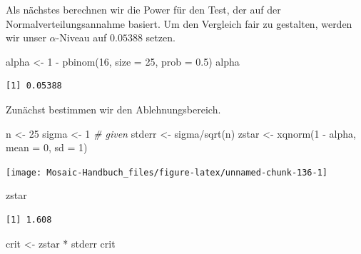 \documentclass[
  ngerman,
]{scrbook}
\newenvironment{Shaded}{\begin{snugshade}}{\end{snugshade}}
\newcommand{\AttributeTok}[1]{\textcolor[rgb]{0.77,0.63,0.00}{#1}}
\newcommand{\CommentTok}[1]{\textcolor[rgb]{0.56,0.35,0.01}{\textit{#1}}}
\newcommand{\DecValTok}[1]{\textcolor[rgb]{0.00,0.00,0.81}{#1}}
\newcommand{\FloatTok}[1]{\textcolor[rgb]{0.00,0.00,0.81}{#1}}
\newcommand{\FunctionTok}[1]{\textcolor[rgb]{0.00,0.00,0.00}{#1}}
\newcommand{\NormalTok}[1]{#1}
\newcommand{\OtherTok}[1]{\textcolor[rgb]{0.56,0.35,0.01}{#1}}
\newcommand{\SpecialCharTok}[1]{\textcolor[rgb]{0.00,0.00,0.00}{#1}}
\begin{document}
Als nächstes berechnen wir die Power für den Test, der auf der Normalverteilungsannahme basiert. Um den Vergleich fair zu gestalten, werden wir unser \(\alpha\)-Niveau auf \(0.05388\) setzen.

\begin{Shaded}
\begin{Highlighting}[]
\NormalTok{alpha }\OtherTok{\textless{}{-}} \DecValTok{1} \SpecialCharTok{{-}} \FunctionTok{pbinom}\NormalTok{(}\DecValTok{16}\NormalTok{, }\AttributeTok{size =} \DecValTok{25}\NormalTok{, }\AttributeTok{prob =} \FloatTok{0.5}\NormalTok{)}
\NormalTok{alpha}
\end{Highlighting}
\end{Shaded}

\begin{verbatim}
[1] 0.05388
\end{verbatim}

Zunächst bestimmen wir den Ablehnungsbereich.

\begin{Shaded}
\begin{Highlighting}[]
\NormalTok{n }\OtherTok{\textless{}{-}} \DecValTok{25}
\NormalTok{sigma }\OtherTok{\textless{}{-}} \DecValTok{1} \CommentTok{\# given}
\NormalTok{stderr }\OtherTok{\textless{}{-}}\NormalTok{ sigma}\SpecialCharTok{/}\FunctionTok{sqrt}\NormalTok{(n)}
\NormalTok{zstar }\OtherTok{\textless{}{-}} \FunctionTok{xqnorm}\NormalTok{(}\DecValTok{1} \SpecialCharTok{{-}}\NormalTok{ alpha, }\AttributeTok{mean =} \DecValTok{0}\NormalTok{, }\AttributeTok{sd =} \DecValTok{1}\NormalTok{)}
\end{Highlighting}
\end{Shaded}

\begin{center}\texttt{[image: Mosaic-Handbuch\_files/figure-latex/unnamed-chunk-136-1]} \end{center}

\begin{Shaded}
\begin{Highlighting}[]
\NormalTok{zstar}
\end{Highlighting}
\end{Shaded}

\begin{verbatim}
[1] 1.608
\end{verbatim}

\begin{Shaded}
\begin{Highlighting}[]
\NormalTok{crit }\OtherTok{\textless{}{-}}\NormalTok{ zstar }\SpecialCharTok{*}\NormalTok{ stderr}
\NormalTok{crit}
\end{Highlighting}
\end{Shaded}
\end{document}
